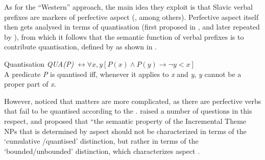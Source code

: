 As for the ``Western'' approach, the main idea they exploit is that Slavic verbal prefixes are markers of perfective aspect (\citealt[see, e.g.,][]{Binnick:91, Krifka:92, Zucchi:99}, among others). Perfective aspect itself then gets analysed in terms of quantisation (first proposed in \citealt{Krifka:86, Krifka:92}, and later repeated by \citealt{Pinon:95}), from which it follows that the semantic function of verbal prefixes is to contribute quantisation, defined by \citet{Krifka:86} as shown in . 

\theoremstyle{definition}
\begin{definition}{Quantisation}\label{def:quant}
\textit{QUA(P)} $\leftrightarrow \forall x,y[P(x) \wedge P(y) \rightarrow \neg y<x]$\\
A predicate \textit{P} is quantised iff, whenever it applies to \textit{x} and \textit{y}, \textit{y} cannot be a proper part of \textit{x}.
\end{definition}

However, \citet{Filip:92} noticed that matters are more complicated, as there are perfective verbs  that fail to be quantised according to the . \citet{Filip:92} raised a number of questions in this respect, and proposed that ``the semantic property of the Incremental Theme NPs that is determined by aspect should not be characterized in terms of the `cumulative /quantised' distinction, but rather in terms of the `bounded/unbounded' distinction, which characterizes aspect \citep[][147]{Filip:92}.

